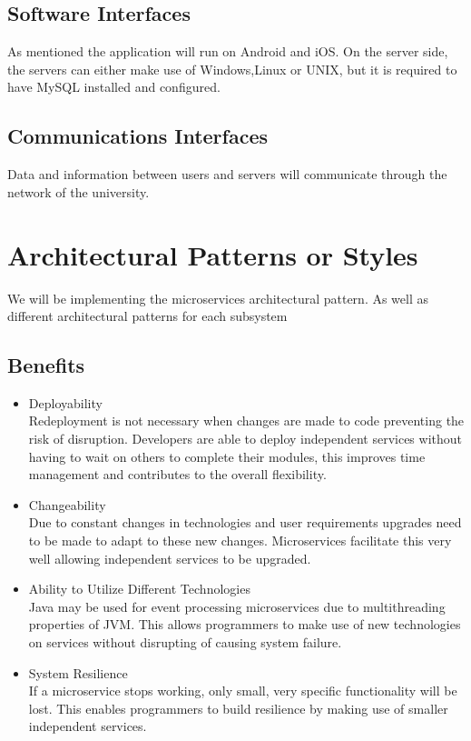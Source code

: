 \documentclass{article}
\begin{document}
	\subsection{Software Interfaces}	

As mentioned the application will run on Android and iOS. On the server side, the servers can either make use of Windows,Linux or UNIX, but it is required
to have MySQL installed and configured.
	
	\subsection{Communications Interfaces}
	
Data and information between users and servers will communicate through the network of the university.

	\pagebreak
 	\section{Architectural Patterns or Styles}
 	We will be implementing the microservices architectural pattern. As well as different architectural patterns for each subsystem
 	
 		\subsection{Benefits}
 			\begin{itemize}
 				\item Deployability
 				\bigskip
 				\\
 				Redeployment is not necessary when changes are made to code preventing the risk of disruption.
 				Developers are able to deploy independent services without having to wait on others to complete their modules, this improves time management and contributes to the overall flexibility.
 				\item Changeability
 				\bigskip
 				\\
 				Due to constant changes in technologies and user requirements upgrades need to be made to adapt to these new changes. Microservices  facilitate this very well allowing independent services to be upgraded.
 				\item Ability to Utilize Different Technologies
 				\bigskip
 				\\
 				Java may be used for event processing microservices due to multithreading properties of JVM.
 				This allows programmers to make use of new technologies on services without disrupting of causing system failure.
 				\item System Resilience
 				\bigskip
 				\\
 				If a microservice stops working, only small, very specific functionality will be lost. This enables programmers to build resilience by making use of smaller independent services.
 			\end{itemize}
\end{document}

